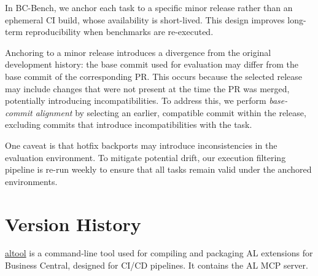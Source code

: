 \documentclass{article}
\begin{document}
In BC-Bench, we anchor each task to a specific minor release rather than an ephemeral CI build, whose availability is short-lived. This design improves long-term reproducibility when benchmarks are re-executed.

Anchoring to a minor release introduces a divergence from the original development history: the base commit used for evaluation may differ from the base commit of the corresponding PR. This occurs because the selected release may include changes that were not present at the time the PR was merged, potentially introducing incompatibilities. To address this, we perform \textit{base-commit alignment} by selecting an earlier, compatible commit within the release, excluding commits that introduce incompatibilities with the task.

One caveat is that hotfix backports may introduce inconsistencies in the evaluation environment. To mitigate potential drift, our execution filtering pipeline is re-run weekly to ensure that all tasks remain valid under the anchored environments.

\section{Version History}
\label{app:version-strategy}

\href{https://www.nuget.org/packages/Microsoft.Dynamics.BusinessCentral.Development.Tools}{altool} is a command-line tool used for compiling and packaging AL extensions for Business Central, designed for CI/CD pipelines. It contains the AL MCP server.
\end{document}

